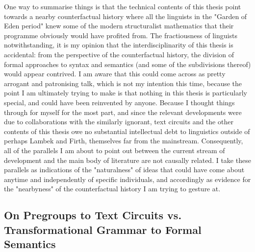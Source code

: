 One way to summarise things is that the technical contents of this thesis point towards a nearby counterfactual history where all the linguists in the "Garden of Eden period" \citep{parteeBriefHistorySyntaxSemantics2014} knew some of the modern structuralist mathematics that their programme obviously would have profited from. The fractiousness of linguists notwithstanding, it is my opinion that the interdisciplinarity of this thesis is accidental: from the perspective of the counterfactual history, the division of formal approaches to syntax and semantics (and some of the subdivisions thereof) would appear contrived. I am aware that this could come across as pretty arrogant and patronising talk, which is not my intention this time, because the point I am ultimately trying to make is that nothing in this thesis is particularly special, and could have been reinvented by anyone. Because I thought things through for myself for the most part, and since the relevant developments were due to collaborations with the similarly ignorant, text circuits and the other contents of this thesis owe no substantial intellectual debt to linguistics outside of perhaps Lambek and Firth, themselves far from the mainstream. Consequently, all of the parallels I am about to point out between the current stream of development and the main body of literature are not causally related. I take these parallels as indications of the "naturalness" of ideas that could have come about anytime and independently of specific individuals, and accordingly as evidence for the "nearbyness" of the counterfactual history I am trying to gesture at.

\subsection{On Pregroups to Text Circuits vs. Transformational Grammar to Formal Semantics}



